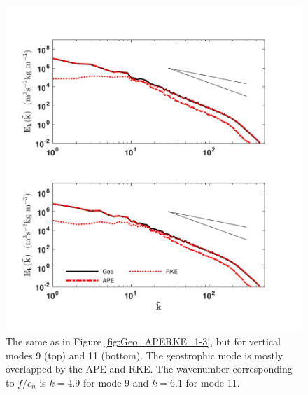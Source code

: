 \begin{figure}[H]
\includegraphics[scale=1]{Chapter4/img/Geo_APERKE_9-11}
\caption{The same as in Figure \ref{fig:Geo_APERKE_1-3}, but for vertical modes 9 (top) and 11 (bottom). The geostrophic mode is mostly overlapped by the APE and RKE. The wavenumber corresponding to $f/c_n$ is $\tilde{k} = 4.9$ for mode 9 and $\tilde{k} = 6.1$ for mode 11.}
\label{fig:Geo_APERKE_9-11}
\end{figure}

